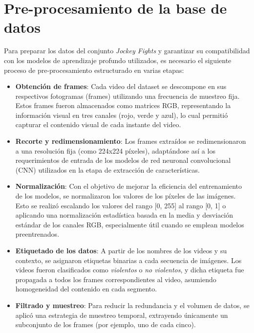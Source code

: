 \section{Pre-procesamiento de la base de datos}

Para preparar los datos del conjunto \textit{Jockey Fights} y 
garantizar su compatibilidad con los modelos de aprendizaje 
profundo utilizados, es necesario el siguiente proceso de 
pre-procesamiento estructurado en varias etapas:

\begin{itemize}
    \item \textbf{Obtención de frames}: Cada video del dataset 
    se descompone en sus respectivos fotogramas (frames) 
    utilizando una frecuencia de muestreo fija. Estos frames 
    fueron almacenados como matrices RGB, representando la 
    información visual en tres canales (rojo, verde y azul), 
    lo cual permitió capturar el contenido visual de cada 
    instante del video.

    \item \textbf{Recorte y redimensionamiento}: Los frames 
    extraídos se redimensionaron a una resolución fija 
    (como 224x224 píxeles), adaptándose así a los 
    requerimientos de entrada de los modelos de red neuronal 
    convolucional (CNN) utilizados en la etapa de extracción 
    de características.

    \item \textbf{Normalización}: Con el objetivo de mejorar 
    la eficiencia del entrenamiento de los modelos, se 
    normalizaron los valores de los píxeles de las imágenes. 
    Esto se realizó escalando los valores del rango [0, 255] 
    al rango [0, 1] o aplicando una normalización estadística 
    basada en la media y desviación estándar de los canales 
    RGB, especialmente útil cuando se emplean modelos 
    preentrenados.

    \item \textbf{Etiquetado de los datos}: A partir de los 
    nombres de los videos y su contexto, se asignaron etiquetas 
    binarias a cada secuencia de imágenes. Los videos fueron 
    clasificados como \textit{violentos} o 
    \textit{no violentos}, y dicha etiqueta fue propagada a 
    todos los frames correspondientes al video, asumiendo 
    homogeneidad del contenido en cada segmento.

    \item \textbf{Filtrado y muestreo}: Para reducir la 
    redundancia y el volumen de datos, se aplicó una 
    estrategia de muestreo temporal, extrayendo únicamente un 
    subconjunto de los frames (por ejemplo, uno de cada cinco). 

\end{itemize}

